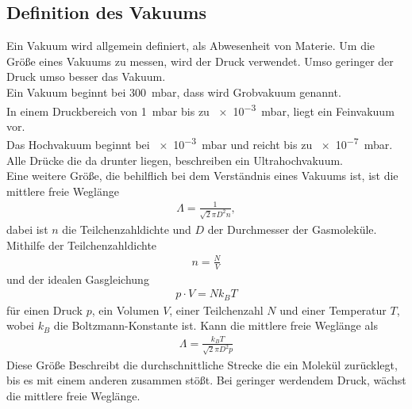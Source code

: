 \subsection{Definition des Vakuums}
Ein Vakuum wird allgemein definiert, als Abwesenheit von Materie.
Um die Größe eines Vakuums zu messen, wird der Druck verwendet. Umso geringer der Druck umso besser das Vakuum.\\
Ein Vakuum beginnt bei \SI{300}{\milli\bar}, dass wird Grobvakuum genannt.\\
In einem Druckbereich von \SI{1}{\milli\bar} bis zu \SI{e-3}{\milli\bar}, liegt ein Feinvakuum vor.\\
Das Hochvakuum beginnt bei \SI{e-3}{\milli\bar} und reicht bis zu \SI{e-7}{\milli\bar}. Alle Drücke die da drunter liegen, beschreiben ein Ultrahochvakuum.\\
Eine weitere Größe, die behilflich bei dem Verständnis eines Vakuums ist, ist die mittlere freie Weglänge
\begin{align}
\Lambda = \frac{1}{\sqrt{2}\pi D^2n},
\end{align}
dabei ist $n$ die Teilchenzahldichte und $D$ der Durchmesser der Gasmoleküle. Mithilfe der Teilchenzahldichte 
\begin{align}
n=\frac{N}{V}
\end{align}
und der idealen Gasgleichung
\begin{align}
p\cdot V = N k_B T \label{eq:IdealGas}
\end{align}
für einen Druck $p$, ein Volumen $V$, einer Teilchenzahl $N$ und einer Temperatur $T$, wobei $k_B$ die Boltzmann-Konstante ist.
Kann die mittlere freie Weglänge als
\begin{align}
\Lambda = \frac{k_BT}{\sqrt{2}\pi D^2p}
\end{align} 
Diese Größe Beschreibt die durchschnittliche Strecke die ein Molekül zurücklegt, bis es mit einem anderen zusammen stößt. Bei geringer werdendem Druck, wächst die mittlere freie Weglänge.

